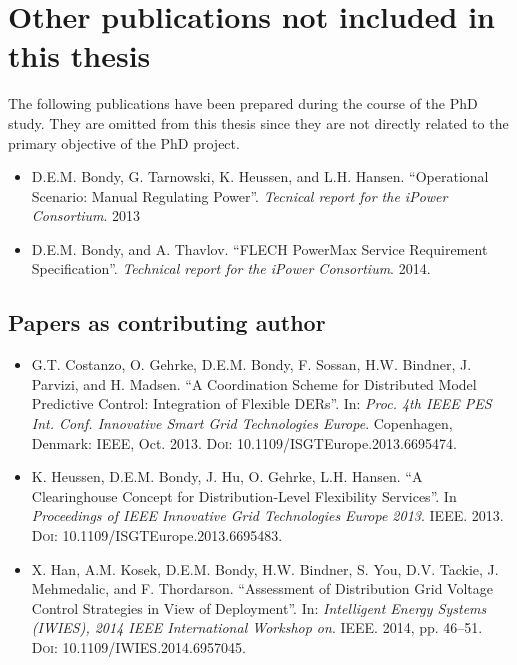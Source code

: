 \section*{Other publications not included in this thesis}
The following publications have been prepared during the course of the PhD study. They are omitted from this thesis since they are not directly related to the primary objective of the PhD project.
\begin{itemize}
	\item D.E.M. Bondy, G. Tarnowski, K. Heussen, and L.H. Hansen. ``Operational Scenario: Manual Regulating Power''. \emph{Tecnical report for the iPower Consortium}. 2013
	\item D.E.M. Bondy, and A. Thavlov. ``FLECH PowerMax Service Requirement Specification''. \emph{Technical report for the iPower Consortium}. 2014.
\end{itemize}

\subsection*{Papers as contributing author}
\begin{itemize}
	\item G.T. Costanzo, O. Gehrke, D.E.M. Bondy, F. Sossan, H.W. Bindner, J. Parvizi, and H. Madsen. ``A Coordination Scheme for Distributed Model Predictive Control: Integration of Flexible DERs''. In: \emph{Proc. 4th IEEE PES Int. Conf. Innovative Smart Grid Technologies Europe}. Copenhagen, Denmark: IEEE, Oct. 2013. \textsc{Doi}: 10.1109/ISGTEurope.2013.6695474.
	\item K. Heussen, D.E.M. Bondy, J. Hu, O. Gehrke, L.H. Hansen. ``A Clearinghouse Concept for Distribution-Level Flexibility Services''. In \emph{Proceedings of IEEE Innovative Grid Technologies Europe 2013}. IEEE. 2013. \textsc{Doi}: 10.1109/ISGTEurope.2013.6695483.
	\item X. Han, A.M. Kosek, D.E.M. Bondy, H.W. Bindner, S. You, D.V. Tackie, J. Mehmedalic, and F. Thordarson. ``Assessment of Distribution Grid Voltage Control Strategies in View of Deployment''. In: \emph{Intelligent Energy Systems (IWIES), 2014 IEEE International Workshop on}. IEEE. 2014, pp. 46–51. \textsc{Doi}: 10.1109/IWIES.2014.6957045.
\end{itemize}
